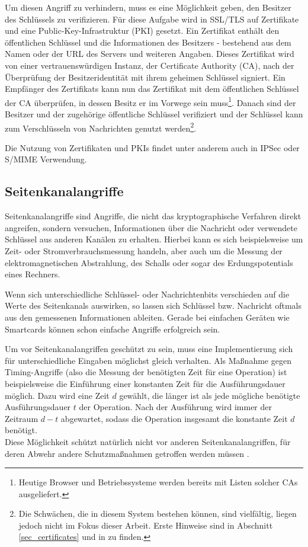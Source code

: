 Um diesen Angriff zu verhindern, muss es eine Möglichkeit geben, den Besitzer des Schlüssels zu verifizieren. Für diese Aufgabe wird in SSL/TLS auf Zertifikate und eine Public-Key-Infrastruktur (PKI) gesetzt. Ein Zertifikat enthält den öffentlichen Schlüssel und die Informationen des Besitzers - bestehend aus dem Namen oder der URL des Servers und weiteren Angaben. Dieses Zertifikat wird von einer vertrauenswürdigen Instanz, der Certificate Authority (CA), nach der Überprüfung der Besitzeridentität mit ihrem geheimen Schlüssel signiert. Ein Empfänger des Zertifikats kann nun das Zertifikat mit dem öffentlichen Schlüssel der CA überprüfen, in dessen Besitz er im Vorwege sein muss\footnote{
	Heutige Browser und Betriebssysteme werden bereits mit Listen solcher CAs ausgeliefert.
}. Danach sind der Besitzer und der zugehörige öffentliche Schlüssel verifiziert und der Schlüssel kann zum Verschlüsseln von Nachrichten genutzt werden\footnote{
	Die Schwächen, die in diesem System bestehen können, sind vielfältig, liegen jedoch nicht im Fokus dieser Arbeit. Erste Hinweise sind in Abschnitt \ref{sec_certificates} und in \cite{ferguson10} zu finden.
}. 

Die Nutzung von Zertifikaten und PKIs findet unter anderem auch in IPSec oder S/MIME Verwendung. 

\subsection{Seitenkanalangriffe}
Seitenkanalangriffe sind Angriffe, die nicht das kryptographische Verfahren direkt angreifen, sondern versuchen, Informationen über die Nachricht oder verwendete Schlüssel aus anderen Kanälen zu erhalten. Hierbei kann es sich beispielsweise um Zeit- oder Stromverbrauchsmessung handeln, aber auch um die Messung der elektromagnetischen Abstrahlung, des Schalls oder sogar des Erdungspotentials eines Rechners. 

Wenn sich unterschiedliche Schlüssel- oder Nachrichtenbits verschieden auf die Werte des Seitenkanals auswirken, so lassen sich Schlüssel bzw. Nachricht oftmals aus den gemessenen Informationen ableiten. Gerade bei einfachen Geräten wie Smartcards können schon einfache Angriffe erfolgreich sein.

Um vor Seitenkanalangriffen geschützt zu sein, muss eine Implementierung sich für unterschiedliche Eingaben möglichst gleich verhalten. Als Maßnahme gegen Timing-Angriffe (also die Messung der benötigten Zeit für eine Operation) ist beispielsweise die Einführung einer konstanten Zeit für die Ausführungsdauer möglich. Dazu wird eine Zeit \(d\) gewählt, die länger ist als jede mögliche benötigte Ausführungsdauer \(t\) der Operation. Nach der Ausführung wird immer der Zeitraum \(d-t\) abgewartet, sodass die Operation insgesamt die konstante Zeit \(d\) benötigt.\\
Diese Möglichkeit schützt natürlich nicht vor anderen Seitenkanalangriffen, für deren Abwehr andere Schutzmaßnahmen getroffen werden müssen \cite{ferguson10}.


